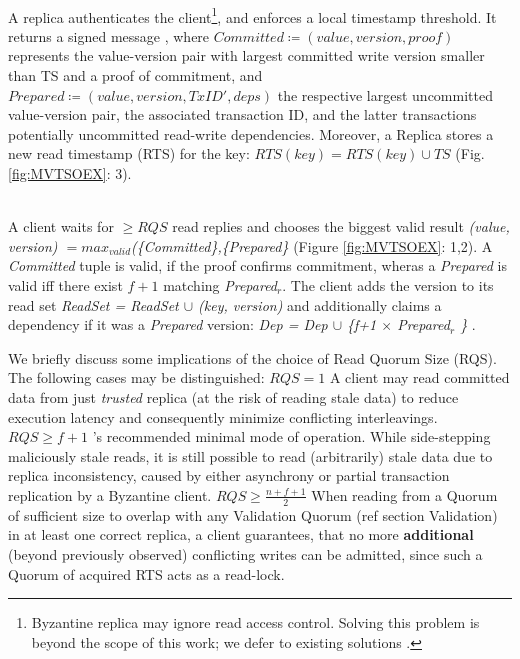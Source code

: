 \\
A replica authenticates the client\footnote{Byzantine replica may ignore read access control. Solving this problem is beyond the scope of this work; we defer to existing solutions \cite{basu2019efficient}.}, and enforces a local timestamp threshold.  It returns a signed message , where $Committed \coloneqq (value, version, proof)$ represents the value-version pair with largest committed write version smaller than TS and a proof of commitment,  and $Prepared \coloneqq (value, version, TxID', deps)$ the respective largest uncommitted value-version pair, the associated transaction ID, and the latter transactions potentially uncommitted read-write dependencies. Moreover, a Replica stores a new read timestamp (RTS) for the key: $RTS(key) = RTS(key) \cup TS$ (Fig. \ref{fig:MVTSOEX}: 3). 

\\
A client waits for $\geq RQS$ read replies and chooses the biggest valid result \textit{(value, version) $= max_{valid}$(\{Committed\},\{Prepared\}} (Figure \ref{fig:MVTSOEX}: 1,2). A \textit{Committed} tuple is valid, if the proof confirms commitment, wheras a \textit{Prepared} is valid iff there exist $f+1$ matching \textit{Prepared$_r$}. The client adds the version to its read set \textit{ReadSet = ReadSet $\cup$ (key, version)} and additionally claims a dependency if it was a \textit{Prepared} version: \textit{Dep = Dep $\cup$ \{f+1 $\times$ Prepared$_r$ \}} . 


We briefly discuss some implications of the choice of Read Quorum Size (RQS). The following cases may be distinguished: \one \textbf{$RQS = 1$} A client may read committed data from just \textit{trusted} replica (at the risk of reading stale data) to reduce execution latency and consequently minimize conflicting interleavings. \two \textbf{$RQS \geq f+1$} \sys{}'s recommended minimal mode of operation. While side-stepping maliciously stale reads, it is still possible to read (arbitrarily) stale data due to replica inconsistency, caused by either asynchrony or partial transaction replication by a Byzantine client.
\three \textbf{$RQS \geq \frac{n+f+1}{2}$} When reading from a Quorum of sufficient size to overlap with any Validation Quorum (ref section Validation) in at least one correct replica, a client guarantees, that no more \textbf{additional} (beyond previously observed) conflicting writes can be admitted, since such a Quorum of acquired RTS acts as a read-lock. 


